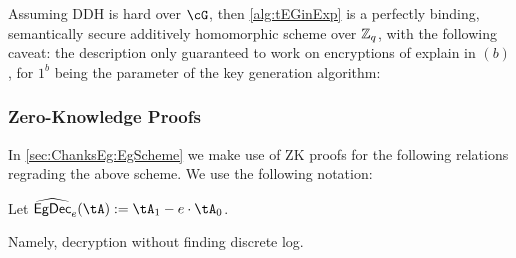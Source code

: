 \begin{theorem}\label{thm:tEGinExp}
	Assuming DDH is hard over $\cG$, then \cref{alg:tEGinExp} is  a perfectly binding,  semantically secure additively homomorphic scheme over ${\mathbb Z}_q$, with the following caveat:  the description only guaranteed to work on encryptions of explain in $(b)$,   for $1^b$ being the parameter  of the key generation algorithm:
\end{theorem}



\subsubsection{Zero-Knowledge Proofs}\label{sec:ChanksEg:Eg:ZK}

In \cref{sec:ChanksEg:EgScheme} we make use of ZK proofs for the following relations regrading the above scheme.   We use the following notation:
\begin{notation}
Let   $\wEgDec_e (\tA) \eqdef \tA_1- e\cdot \tA_0$.  
\end{notation}
Namely, decryption without finding discrete log.  


